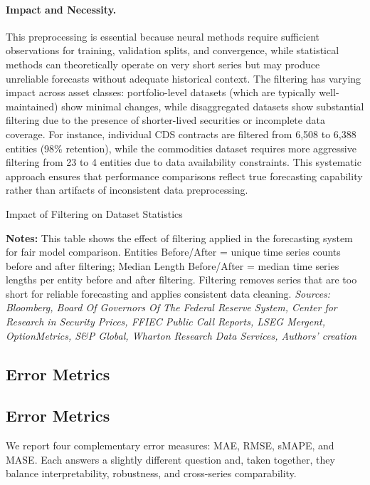 \documentclass{article}
\begin{document}
\paragraph{Impact and Necessity.} This preprocessing is essential because neural methods require sufficient observations for training, validation splits, and convergence, while statistical methods can theoretically operate on very short series but may produce unreliable forecasts without adequate historical context. The filtering has varying impact across asset classes: portfolio-level datasets (which are typically well-maintained) show minimal changes, while disaggregated datasets show substantial filtering due to the presence of shorter-lived securities or incomplete data coverage. For instance, individual CDS contracts are filtered from 6,508 to 6,388 entities (98\% retention), while the commodities dataset requires more aggressive filtering from 23 to 4 entities due to data availability constraints. This systematic approach ensures that performance comparisons reflect true forecasting capability rather than artifacts of inconsistent data preprocessing.

\begin{table}[htbp]
\centering
\caption{Impact of Filtering on Dataset Statistics}
\label{tab:filtered_dataset_stats}

\vspace{0.1cm}
\begin{minipage}{\textwidth}
\scriptsize
\textbf{Notes:} This table shows the effect of filtering applied in the forecasting system for fair model comparison. 
Entities Before/After = unique time series counts before and after filtering; 
Median Length Before/After = median time series lengths per entity before and after filtering. 
Filtering removes series that are too short for reliable forecasting and applies consistent data cleaning.
\emph{Sources: Bloomberg, Board Of Governors Of The Federal Reserve System, Center for Research in Security Prices, FFIEC Public Call Reports, LSEG Mergent, OptionMetrics, S\&P Global, Wharton Research Data Services, Authors' creation}
\end{minipage}
\end{table}

\subsection{Error Metrics}

\subsection{Error Metrics}\label{subsec:error_metrics}
We report four complementary error measures: MAE, RMSE, sMAPE, and MASE. Each answers a slightly different question and, taken together, they balance interpretability, robustness, and cross-series comparability.
\end{document}
